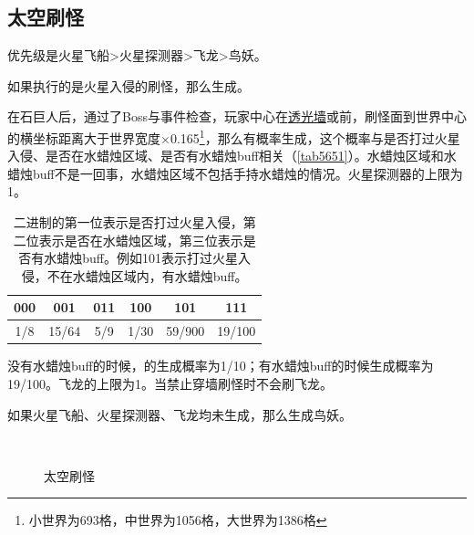 \subsection{太空刷怪}
优先级是火星飞船>火星探测器>飞龙>鸟妖。

如果执行的是火星入侵的刷怪，那么生成。

在石巨人后，通过了Boss与事件检查，玩家中心在\hyperref[app9]{透光墙}或前，刷怪面到世界中心的横坐标距离大于世界宽度$\times$0.165\footnote{小世界为693格，中世界为1056格，大世界为1386格}，那么有概率生成，这个概率与是否打过火星入侵、是否在水蜡烛区域、是否有水蜡烛buff相关（\autoref{tab5651}）。水蜡烛区域和水蜡烛buff不是一回事，水蜡烛区域不包括手持水蜡烛的情况。火星探测器的上限为1。

\begin{table}[!h]
    \centering
    \begin{tabular}{cccccc}
         000&001&011&100&101&111\\\hline
         1/8&15/64&5/9&1/30&59/900&19/100 
    \end{tabular}
    \caption{二进制的第一位表示是否打过火星入侵，第二位表示是否在水蜡烛区域，第三位表示是否有水蜡烛buff。例如101表示打过火星入侵，不在水蜡烛区域内，有水蜡烛buff。}
    \label{tab5651}
\end{table}

没有水蜡烛buff的时候，的生成概率为1/10；有水蜡烛buff的时候生成概率为19/100。飞龙的上限为1。当禁止穿墙刷怪时不会刷飞龙。

如果火星飞船、火星探测器、飞龙均未生成，那么生成鸟妖。
\begin{figure}[h]
    \centering
    \\
    \caption{太空刷怪}
\end{figure}

